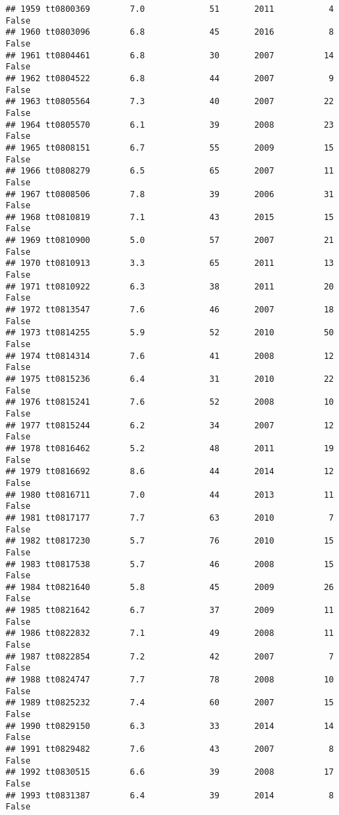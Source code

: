 \documentclass[
]{article}
\begin{document}
\begin{verbatim}
## 1959 tt0800369        7.0             51       2011           4   False
## 1960 tt0803096        6.8             45       2016           8   False
## 1961 tt0804461        6.8             30       2007          14   False
## 1962 tt0804522        6.8             44       2007           9   False
## 1963 tt0805564        7.3             40       2007          22   False
## 1964 tt0805570        6.1             39       2008          23   False
## 1965 tt0808151        6.7             55       2009          15   False
## 1966 tt0808279        6.5             65       2007          11   False
## 1967 tt0808506        7.8             39       2006          31   False
## 1968 tt0810819        7.1             43       2015          15   False
## 1969 tt0810900        5.0             57       2007          21   False
## 1970 tt0810913        3.3             65       2011          13   False
## 1971 tt0810922        6.3             38       2011          20   False
## 1972 tt0813547        7.6             46       2007          18   False
## 1973 tt0814255        5.9             52       2010          50   False
## 1974 tt0814314        7.6             41       2008          12   False
## 1975 tt0815236        6.4             31       2010          22   False
## 1976 tt0815241        7.6             52       2008          10   False
## 1977 tt0815244        6.2             34       2007          12   False
## 1978 tt0816462        5.2             48       2011          19   False
## 1979 tt0816692        8.6             44       2014          12   False
## 1980 tt0816711        7.0             44       2013          11   False
## 1981 tt0817177        7.7             63       2010           7   False
## 1982 tt0817230        5.7             76       2010          15   False
## 1983 tt0817538        5.7             46       2008          15   False
## 1984 tt0821640        5.8             45       2009          26   False
## 1985 tt0821642        6.7             37       2009          11   False
## 1986 tt0822832        7.1             49       2008          11   False
## 1987 tt0822854        7.2             42       2007           7   False
## 1988 tt0824747        7.7             78       2008          10   False
## 1989 tt0825232        7.4             60       2007          15   False
## 1990 tt0829150        6.3             33       2014          14   False
## 1991 tt0829482        7.6             43       2007           8   False
## 1992 tt0830515        6.6             39       2008          17   False
## 1993 tt0831387        6.4             39       2014           8   False

\end{verbatim}
\end{document}
